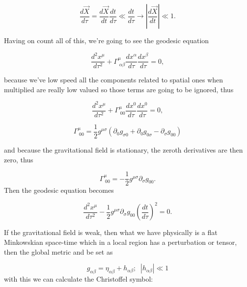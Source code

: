     \begin{equation}
        \frac{d\Vec{X}}{d\tau} = \frac{d\Vec{X}}{dt}\frac{dt}{d\tau} \ll \frac{dt}{d\tau}\rightarrow \left|\frac{d\Vec{X}}{dt} \right|\ll1.
    \end{equation}

    Having on count all of this, we're going to see the geodesic equation 
    
    \begin{equation}
        \frac{d^2x^{\mu}}{d\tau^2} + \Gamma^{\mu}_{\;\alpha\beta}\frac{dx^{\alpha}}{d\tau}\frac{dx^{\beta}}{d\tau}=0,
    \end{equation}

    because we've low speed all the components related to spatial ones when multiplied are really low valued so those terms are going to be ignored, thus

    \begin{equation}
        \frac{d^2x^{\mu}}{d\tau^2}+\Gamma^{\mu}_{\;00}\frac{dx^0}{d\tau}\frac{dx^0}{d\tau}=0,
    \end{equation}

    \begin{equation}
        \Gamma^{\mu}_{\;00} = \frac{1}{2}g^{\mu\sigma}\left(\partial_0g_{\sigma 0}+\partial_0g_{0\sigma} - \partial_{\sigma}g_{00} \right)
    \end{equation}

    and because the gravitational field is stationary, the zeroth derivatives are then zero, thus

    \begin{equation}
        \Gamma^{\mu}_{\;00} = -\frac{1}{2}g^{\mu\sigma}\partial_{\sigma}g_{00}.
    \end{equation}
    Then the geodesic equation becomes

    \begin{equation}
        \frac{d^2x^{\mu}}{d\tau^2} - \frac{1}{2}g^{\mu\sigma}\partial_{\sigma}g_{00}\left(\frac{dt}{d\tau} \right)^2=0.
    \end{equation}

    If the gravitational field is weak, then what we have physically is a flat Minkowskian space-time which in a local region has a perturbation or tensor, then the global metric and be set as

    \begin{equation}
        g_{\alpha\beta} = \eta_{\alpha\beta} + h_{\alpha\beta};\;\; |h_{\alpha\beta}|\ll 1
    \end{equation}
    with this we can calculate the Christoffel symbol:

